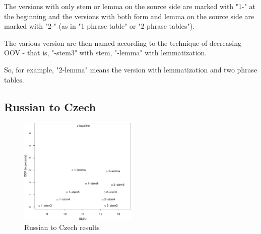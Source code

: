 \documentclass[11pt,letterpaper]{article}
\begin{document}
The versions with only stem or lemma on the source side are marked with "1-" at the beginning and the versions with both form and lemma on the source side are marked with "2-" (as in "1 phrase table" or "2 phrase tables").

The various version are then named according to the technique of decreasing OOV - that is, "-stem3" with stem, "-lemma" with lemmatization.

So, for example, "2-lemma" means the version with lemmatization and two phrase tables.

\subsection{Russian to Czech}

\begin{figure}
\centering
\includegraphics[width=0.5\textwidth]{plot_csru}
\caption{Russian to Czech results}
\label{graf:csru}
\end{figure}
\end{document}
